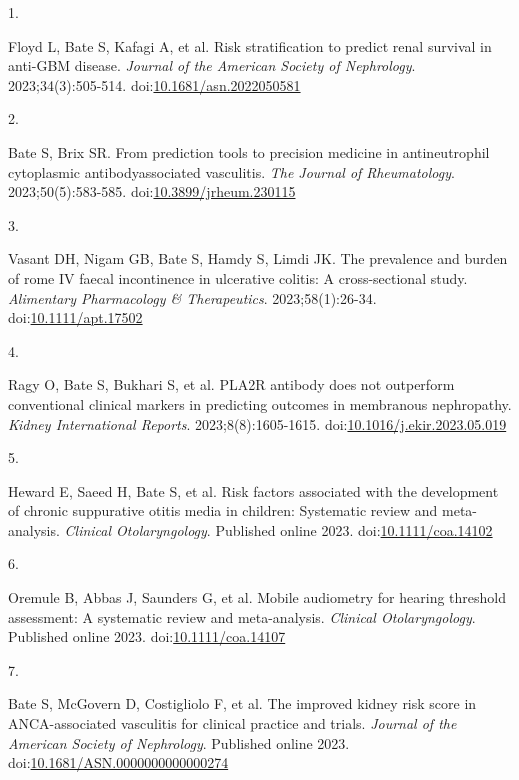 \documentclass[11pt,a4paper,]{awesome-cv}
\newlength{\cslhangindent}
\newlength{\csllabelwidth}
\newenvironment{CSLReferences}[2] %
 {\begin{list}{}{%
  \setlength{\itemindent}{0pt}
  \setlength{\leftmargin}{0pt}
  \setlength{\parsep}{0pt}
  \ifodd #1
   \setlength{\leftmargin}{\cslhangindent}
   \setlength{\itemindent}{-1\cslhangindent}
  \fi
  \setlength{\itemsep}{#2\baselineskip}}}
 {\end{list}}
\newcommand{\CSLLeftMargin}[1]{\parbox[t]{\csllabelwidth}{\strut#1\strut}}
\newcommand{\CSLRightInline}[1]{\parbox[t]{\linewidth - \csllabelwidth}{\strut#1\strut}}
\begin{document}
\hypertarget{refs-d5ae63820b442fd6cb590e2d43ddfab5}{}
\begin{CSLReferences}{0}{0}
\leavevmode{}%
\CSLLeftMargin{1. }%
\CSLRightInline{Floyd L, Bate S, Kafagi A, et al. Risk stratification to
predict renal survival in anti-GBM disease. \emph{Journal of the
American Society of Nephrology}. 2023;34(3):505-514.
doi:\href{https://doi.org/10.1681/asn.2022050581}{10.1681/asn.2022050581}}

\leavevmode{}%
\CSLLeftMargin{2. }%
\CSLRightInline{Bate S, Brix SR. From prediction tools to precision
medicine in antineutrophil cytoplasmic antibodyassociated vasculitis.
\emph{The Journal of Rheumatology}. 2023;50(5):583-585.
doi:\href{https://doi.org/10.3899/jrheum.230115}{10.3899/jrheum.230115}}

\leavevmode{}%
\CSLLeftMargin{3. }%
\CSLRightInline{Vasant DH, Nigam GB, Bate S, Hamdy S, Limdi JK. The
prevalence and burden of rome IV faecal incontinence in ulcerative
colitis: A cross-sectional study. \emph{Alimentary Pharmacology \&
Therapeutics}. 2023;58(1):26-34.
doi:\href{https://doi.org/10.1111/apt.17502}{10.1111/apt.17502}}

\leavevmode{}%
\CSLLeftMargin{4. }%
\CSLRightInline{Ragy O, Bate S, Bukhari S, et al. PLA2R antibody does
not outperform conventional clinical markers in predicting outcomes in
membranous nephropathy. \emph{Kidney International Reports}.
2023;8(8):1605-1615.
doi:\href{https://doi.org/10.1016/j.ekir.2023.05.019}{10.1016/j.ekir.2023.05.019}}

\leavevmode{}%
\CSLLeftMargin{5. }%
\CSLRightInline{Heward E, Saeed H, Bate S, et al. Risk factors
associated with the development of chronic suppurative otitis media in
children: Systematic review and meta-analysis. \emph{Clinical
Otolaryngology}. Published online 2023.
doi:\href{https://doi.org/10.1111/coa.14102}{10.1111/coa.14102}}

\leavevmode{}%
\CSLLeftMargin{6. }%
\CSLRightInline{Oremule B, Abbas J, Saunders G, et al. Mobile audiometry
for hearing threshold assessment: A systematic review and meta-analysis.
\emph{Clinical Otolaryngology}. Published online 2023.
doi:\href{https://doi.org/10.1111/coa.14107}{10.1111/coa.14107}}

\leavevmode{}%
\CSLLeftMargin{7. }%
\CSLRightInline{Bate S, McGovern D, Costigliolo F, et al. The improved
kidney risk score in ANCA-associated vasculitis for clinical practice
and trials. \emph{Journal of the American Society of Nephrology}.
Published online 2023.
doi:\href{https://doi.org/10.1681/ASN.0000000000000274}{10.1681/ASN.0000000000000274}}


\end{CSLReferences}
\end{document}
